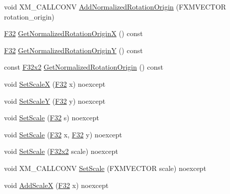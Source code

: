 \begin{DoxyCompactItemize}
\item 
void X\+M\+\_\+\+C\+A\+L\+L\+C\+O\+NV \hyperlink{classmage_1_1_sprite_transform_a5571cc3e5700aba23f8c229675f10c3e}{Add\+Normalized\+Rotation\+Origin} (F\+X\+M\+V\+E\+C\+T\+OR rotation\+\_\+origin)
\item 
\hyperlink{namespacemage_aa97e833b45f06d60a0a9c4fc22ae02c0}{F32} \hyperlink{classmage_1_1_sprite_transform_a44a0577d7c136650027da9f5b8a6be77}{Get\+Normalized\+Rotation\+OriginX} () const
\item 
\hyperlink{namespacemage_aa97e833b45f06d60a0a9c4fc22ae02c0}{F32} \hyperlink{classmage_1_1_sprite_transform_afc002a5d0357c2dc638cc166904446d1}{Get\+Normalized\+Rotation\+OriginY} () const
\item 
const \hyperlink{namespacemage_aa87237ad091f5cd7da612b8523fc108f}{F32x2} \hyperlink{classmage_1_1_sprite_transform_aa3b7b5d1f060c2a60a08545f5b217d62}{Get\+Normalized\+Rotation\+Origin} () const
\item 
void \hyperlink{classmage_1_1_sprite_transform_a2e19b9bffce49955e57094b1eda6af52}{Set\+ScaleX} (\hyperlink{namespacemage_aa97e833b45f06d60a0a9c4fc22ae02c0}{F32} x) noexcept
\item 
void \hyperlink{classmage_1_1_sprite_transform_a98304f37ff1aa359122e9ea08b060415}{Set\+ScaleY} (\hyperlink{namespacemage_aa97e833b45f06d60a0a9c4fc22ae02c0}{F32} y) noexcept
\item 
void \hyperlink{classmage_1_1_sprite_transform_ad11fab7a12f6d1ce79eab12e16adab93}{Set\+Scale} (\hyperlink{namespacemage_aa97e833b45f06d60a0a9c4fc22ae02c0}{F32} s) noexcept
\item 
void \hyperlink{classmage_1_1_sprite_transform_a4f20a52939fc8a7ab285673861d3deae}{Set\+Scale} (\hyperlink{namespacemage_aa97e833b45f06d60a0a9c4fc22ae02c0}{F32} x, \hyperlink{namespacemage_aa97e833b45f06d60a0a9c4fc22ae02c0}{F32} y) noexcept
\item 
void \hyperlink{classmage_1_1_sprite_transform_a9a37baa13eb28bef24c93d7c10fb7188}{Set\+Scale} (\hyperlink{namespacemage_aa87237ad091f5cd7da612b8523fc108f}{F32x2} scale) noexcept
\item 
void X\+M\+\_\+\+C\+A\+L\+L\+C\+O\+NV \hyperlink{classmage_1_1_sprite_transform_a1e9c60025ebbbaf88fe17af85526f5c8}{Set\+Scale} (F\+X\+M\+V\+E\+C\+T\+OR scale) noexcept
\item 
void \hyperlink{classmage_1_1_sprite_transform_a4f2a1c2dd0da35c0fdf0d43a675be3bc}{Add\+ScaleX} (\hyperlink{namespacemage_aa97e833b45f06d60a0a9c4fc22ae02c0}{F32} x) noexcept
\item 

\end{DoxyCompactItemize}
